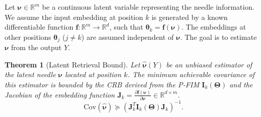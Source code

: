 \documentclass{article}
\newtheorem{theorem}{Theorem}[section]
\theoremstyle{definition}
\begin{document}
Let $\boldsymbol{\nu} \in \mathbb{R}^m$ be a continuous latent variable representing the needle information. We assume the input embedding at position $k$ is generated by a known differentiable function $\mathbf{f}: \mathbb{R}^m \to \mathbb{R}^d$, such that $\boldsymbol{\theta}_k = \mathbf{f}(\boldsymbol{\nu})$. The embeddings at other positions $\boldsymbol{\theta}_j$ ($j\neq k$) are assumed independent of $\boldsymbol{\nu}$. The goal is to estimate $\boldsymbol{\nu}$ from the output $Y$.

\begin{theorem}[Latent Retrieval Bound]
\label{thm:latent_retrieval}
Let $\hat{\boldsymbol{\nu}}(Y)$ be an unbiased estimator of the latent needle $\boldsymbol{\nu}$ located at position $k$. The minimum achievable covariance of this estimator is bounded by the CRB derived from the P-FIM $\mathbf{I}_k(\mathbf{\Theta})$ and the Jacobian of the embedding function $\mathbf{J}_k = \frac{\partial \mathbf{f}(\boldsymbol{\nu})}{\partial \boldsymbol{\nu}} \in \mathbb{R}^{d \times m}$.
\begin{equation}
    \text{Cov}(\hat{\boldsymbol{\nu}}) \succeq (\mathbf{J}_k^T \mathbf{I}_k(\mathbf{\Theta}) \mathbf{J}_k)^{-1}.
\end{equation}
\end{theorem}
\end{document}
